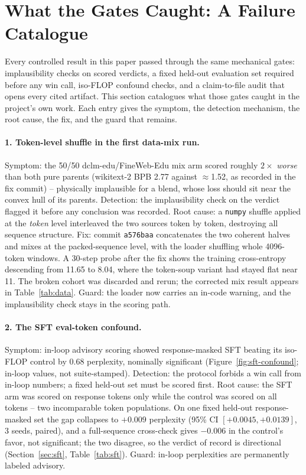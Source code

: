 \section{What the Gates Caught: A Failure Catalogue}\label{sec:failures}

Every controlled result in this paper passed through the same mechanical gates: implausibility checks on scored verdicts, a fixed held-out evaluation set required before any win call, iso-FLOP confound checks, and a claim-to-file audit that opens every cited artifact. This section catalogues what those gates caught in the project's own work. Each entry gives the symptom, the detection mechanism, the root cause, the fix, and the guard that remains.

\paragraph{1. Token-level shuffle in the first data-mix run.}
Symptom: the 50/50 dclm-edu/FineWeb-Edu mix arm scored roughly $2\times$ \emph{worse} than both pure parents (wikitext-2 BPB 2.77 against $\approx$1.52, as recorded in the fix commit) -- physically implausible for a blend, whose loss should sit near the convex hull of its parents. Detection: the implausibility check on the verdict flagged it before any conclusion was recorded. Root cause: a \texttt{numpy} shuffle applied at the \emph{token} level interleaved the two sources token by token, destroying all sequence structure. Fix: commit \texttt{a576baa} concatenates the two coherent halves and mixes at the packed-sequence level, with the loader shuffling whole 4096-token windows. A 30-step probe after the fix shows the training cross-entropy descending from 11.65 to 8.04, where the token-soup variant had stayed flat near 11. The broken cohort was discarded and rerun; the corrected mix result appears in Table~\ref{tab:data}. Guard: the loader now carries an in-code warning, and the implausibility check stays in the scoring path.

\paragraph{2. The SFT eval-token confound.}
Symptom: in-loop advisory scoring showed response-masked SFT beating its iso-FLOP control by 0.68 perplexity, nominally significant (Figure~\ref{fig:sft-confound}; in-loop values, not suite-stamped). Detection: the protocol forbids a win call from in-loop numbers; a fixed held-out set must be scored first. Root cause: the SFT arm was scored on response tokens only while the control was scored on all tokens -- two incomparable token populations. On one fixed held-out response-masked set the gap collapses to $+0.009$ perplexity (95\% CI $[+0.0045, +0.0139]$, 3 seeds, paired), and a full-sequence cross-check gives $-0.006$ in the control's favor, not significant; the two disagree, so the verdict of record is directional (Section~\ref{sec:sft}, Table~\ref{tab:sft}). Guard: in-loop perplexities are permanently labeled advisory.

